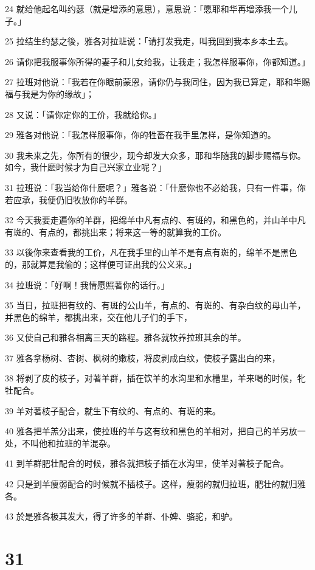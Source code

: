 \par 24 就给他起名叫约瑟（就是增添的意思），意思说：「愿耶和华再增添我一个儿子。」
\par 25 拉结生约瑟之後，雅各对拉班说：「请打发我走，叫我回到我本乡本土去。
\par 26 请你把我服事你所得的妻子和儿女给我，让我走；我怎样服事你，你都知道。」
\par 27 拉班对他说：「我若在你眼前蒙恩，请你仍与我同住，因为我已算定，耶和华赐福与我是为你的缘故」；
\par 28 又说：「请你定你的工价，我就给你。」
\par 29 雅各对他说：「我怎样服事你，你的牲畜在我手里怎样，是你知道的。
\par 30 我未来之先，你所有的很少，现今却发大众多，耶和华随我的脚步赐福与你。如今，我什麽时候才为自己兴家立业呢？」
\par 31 拉班说：「我当给你什麽呢？」雅各说：「什麽你也不必给我，只有一件事，你若应承，我便仍旧牧放你的羊群。
\par 32 今天我要走遍你的羊群，把绵羊中凡有点的、有斑的，和黑色的，并山羊中凡有斑的、有点的，都挑出来；将来这一等的就算我的工价。
\par 33 以後你来查看我的工价，凡在我手里的山羊不是有点有斑的，绵羊不是黑色的，那就算是我偷的；这样便可证出我的公义来。」
\par 34 拉班说：「好啊！我情愿照著你的话行。」
\par 35 当日，拉班把有纹的、有斑的公山羊，有点的、有斑的、有杂白纹的母山羊，并黑色的绵羊，都挑出来，交在他儿子们的手下，
\par 36 又使自己和雅各相离三天的路程。雅各就牧养拉班其余的羊。
\par 37 雅各拿杨树、杏树、枫树的嫩枝，将皮剥成白纹，使枝子露出白的来，
\par 38 将剥了皮的枝子，对著羊群，插在饮羊的水沟里和水槽里，羊来喝的时候，牝牡配合。
\par 39 羊对著枝子配合，就生下有纹的、有点的、有斑的来。
\par 40 雅各把羊羔分出来，使拉班的羊与这有纹和黑色的羊相对，把自己的羊另放一处，不叫他和拉班的羊混杂。
\par 41 到羊群肥壮配合的时候，雅各就把枝子插在水沟里，使羊对著枝子配合。
\par 42 只是到羊瘦弱配合的时候就不插枝子。这样，瘦弱的就归拉班，肥壮的就归雅各。
\par 43 於是雅各极其发大，得了许多的羊群、仆婢、骆驼，和驴。

\chapter{31}

